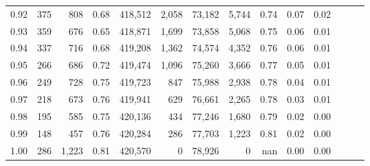 \begin{tabular}{rrrrrrrrrrrrrr}
0.92 &    375 &    808 &  0.68 &  418,512 &    2,058 &  73,182 &   5,744 &  0.74 &  0.07 &      0.02 \\
0.93 &    359 &    676 &  0.65 &  418,871 &    1,699 &  73,858 &   5,068 &  0.75 &  0.06 &      0.01 \\
0.94 &    337 &    716 &  0.68 &  419,208 &    1,362 &  74,574 &   4,352 &  0.76 &  0.06 &      0.01 \\
0.95 &    266 &    686 &  0.72 &  419,474 &    1,096 &  75,260 &   3,666 &  0.77 &  0.05 &      0.01 \\
0.96 &    249 &    728 &  0.75 &  419,723 &      847 &  75,988 &   2,938 &  0.78 &  0.04 &      0.01 \\
0.97 &    218 &    673 &  0.76 &  419,941 &      629 &  76,661 &   2,265 &  0.78 &  0.03 &      0.01 \\
0.98 &    195 &    585 &  0.75 &  420,136 &      434 &  77,246 &   1,680 &  0.79 &  0.02 &      0.00 \\
0.99 &    148 &    457 &  0.76 &  420,284 &      286 &  77,703 &   1,223 &  0.81 &  0.02 &      0.00 \\
1.00 &    286 &  1,223 &  0.81 &  420,570 &        0 &  78,926 &       0 &   nan &  0.00 &      0.00 \\
\bottomrule
\end{tabular}
